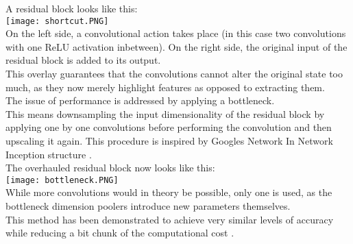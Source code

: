 A residual block looks like this: \\
\texttt{[image: shortcut.PNG]}\\
On the left side, a convolutional action takes place (in this case two convolutions with one ReLU activation inbetween). On the right side, the original input of the residual block is added to its output.\\
This overlay guarantees that the convolutions cannot alter the original state too much, as they now merely highlight features as opposed to extracting them.\\
The issue of performance is addressed by applying a bottleneck.\\
This means downsampling the input dimensionality of the residual block by applying one by one convolutions before performing the convolution and then upscaling it again. This procedure is inspired by Googles Network In Network Inception structure \cite{KaimingHe2015} \cite{Lin2014}.\\
The overhauled residual block now looks like this:\\
\texttt{[image: bottleneck.PNG]}\\
While more convolutions would in theory be possible, only one is used, as the bottleneck dimension poolers introduce new parameters themselves.\\
This method has been demonstrated to achieve very similar levels of accuracy while reducing a bit chunk of the computational cost \cite{KaimingHe2015}.\\

